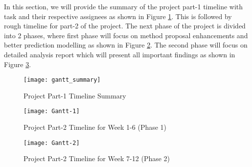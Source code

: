 In this section, we will provide the summary of the project part-1 timeline with task and their respective assignees as shown in Figure \ref{fig:gantt_summary}. This is followed by rough timeline for part-2 of the project. The next phase of the project is divided into 2 phases, where first phase will focus on method proposal enhancements and better prediction modelling as shown in Figure \ref{fig:gantt1}. The second phase will focus on detailed analysis report which will present all important findings as shown in Figure \ref{fig:gantt2}.

\begin{figure}[H]
\centering
\texttt{[image: gantt\_summary]}
\caption{Project Part-1 Timeline Summary}
\label{fig:gantt_summary}
\end{figure}

\begin{figure}[H]
\centering
\texttt{[image: Gantt-1]}
\caption{Project Part-2 Timeline for Week 1-6 (Phase 1)}
\label{fig:gantt1}
\end{figure}

\begin{figure}[H]
\centering
\texttt{[image: Gantt-2]}
\caption{Project Part-2 Timeline for Week 7-12 (Phase 2)}
\label{fig:gantt2}
\end{figure}